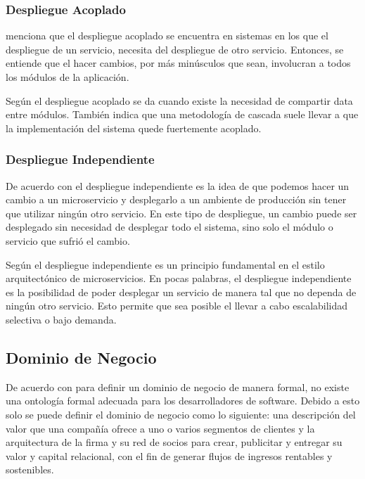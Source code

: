 \subsubsection{Despliegue Acoplado}

\cite{newman2019monolith} menciona que el despliegue acoplado se encuentra en sistemas en los que el
despliegue de un servicio, necesita del despliegue de otro servicio.
Entonces, se entiende que el hacer cambios, por más minúsculos que sean, involucran a todos los módulos
de la aplicación.

Según \cite{nadareishvili2016microservice} el despliegue acoplado se da cuando existe la necesidad
de compartir data entre módulos.
También indica que una metodología de cascada suele llevar a que la implementación del sistema
quede fuertemente acoplado.


\subsubsection{Despliegue Independiente}

De acuerdo con \cite{newman2019monolith} el despliegue independiente es la idea de que podemos
hacer un cambio a un microservicio y desplegarlo a un ambiente de producción sin tener que utilizar
ningún otro servicio.
En este tipo de despliegue, un cambio puede ser desplegado sin necesidad de desplegar todo el sistema,
sino solo el módulo o servicio que sufrió el cambio.

Según \cite{nadareishvili2016microservice} el despliegue independiente es un principio fundamental
en el estilo arquitectónico de microservicios.
En pocas palabras, el despliegue independiente es la posibilidad de poder desplegar un 
servicio de manera tal que no dependa de ningún otro servicio.
Esto permite que sea posible el llevar a cabo escalabilidad selectiva o bajo demanda.


\subsection{Dominio de Negocio}

De acuerdo con \cite{bosselmann2014domain} para definir un dominio de negocio de manera formal,
no existe una ontología formal adecuada para los desarrolladores de software.
Debido a esto solo se puede definir el dominio de negocio como lo siguiente: una descripción
del valor que una compañía ofrece a uno o varios segmentos de clientes y la arquitectura de
la firma y su red de socios para crear, publicitar y entregar su valor y capital relacional,
con el fin de generar flujos de ingresos rentables y sostenibles.

